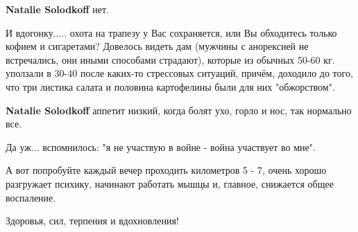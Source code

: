 \begin{itemize}
\begin{itemize}
\textbf{Natalie Solodkoff} нет.
\end{itemize}

 

И вдогонку..... охота на трапезу у Вас сохраняется, или Вы обходитесь только
кофием и сигаретами? Довелось видеть дам (мужчины с анорексией не встречались,
они иными способами страдают), которые из обычных 50-60 кг. уползали в 30-40
после каких-то стрессовых ситуаций, причём, доходило до того, что три листика
салата и половина картофелины были для них "обжорством".

\begin{itemize}
 
\textbf{Natalie Solodkoff} аппетит низкий, когда болят ухо, горло и нос, так нормально все.
\end{itemize}

 
Да уж... вспомнилось: "я не участвую в войне - война участвует во мне".

 
А вот попробуйте каждый вечер проходить километров 5 - 7, очень хорошо разгружает психику, начинают работать мышцы и, главное, снижается общее воспаление.

 
Здоровья, сил, терпения и вдохновления!

\end{itemize}

